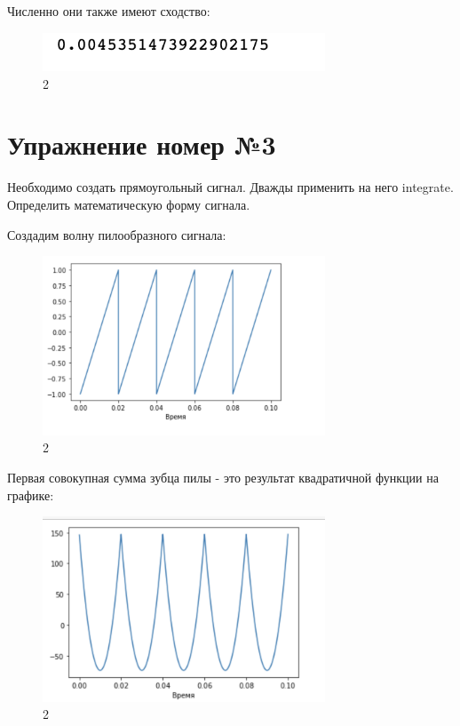 \documentclass[10pt,a4paper,oneside]{article}
\begin{document}
Численно они также имеют сходство:

\begin{figure}[H]
        \centering
        \includegraphics[width=0.75\textwidth]{pics/8.png}
        \caption{2}
        \label{fig:first}
\end{figure}

\section{Упражнение номер №3}

Необходимо создать прямоугольный сигнал. Дважды применить на него integrate. Определить математическую форму сигнала. 

Создадим волну пилообразного сигнала:

\begin{figure}[H]
        \centering
        \includegraphics[width=0.75\textwidth]{pics/9.png}
        \caption{2}
        \label{fig:first}
\end{figure}

Первая совокупная сумма зубца пилы - это результат квадратичной функции на графике:

\begin{figure}[H]
        \centering
        \includegraphics[width=0.75\textwidth]{pics/10.png}
        \caption{2}
        \label{fig:first}
\end{figure}
\end{document}

